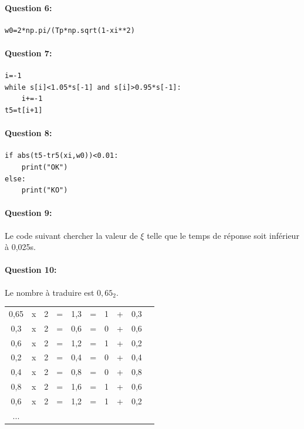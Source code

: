 \paragraph{Question 6:}

\begin{center}
\begin{verbatim}
w0=2*np.pi/(Tp*np.sqrt(1-xi**2)
\end{verbatim}
\end{center}

\paragraph{Question 7:}


\begin{center}
\begin{verbatim}
i=-1
while s[i]<1.05*s[-1] and s[i]>0.95*s[-1]:
    i+=-1
t5=t[i+1]
\end{verbatim}
\end{center}

\paragraph{Question 8:}

\begin{center}
\begin{verbatim}
if abs(t5-tr5(xi,w0))<0.01:
    print("OK")
else:
    print("KO")
\end{verbatim}
\end{center}

\paragraph{Question 9:}

Le code suivant chercher la valeur de $\xi$ telle que le temps de réponse soit inférieur à 0,025s.

\paragraph{Question 10:}

Le nombre à traduire est $0,65_2$.

\begin{tabular}{c c c c c c c c c c}
0,65 & x & 2 & = & 1,3 & = &  1 & + & 0,3 \\
0,3 & x & 2 & = & 0,6 & = &  0 & + & 0,6 \\
0,6 & x & 2 & = & 1,2 & = &  1 & + & 0,2 \\
0,2 & x & 2 & = & 0,4 & = &  0 & + & 0,4 \\
0,4 & x & 2 & = & 0,8 & = &  0 & + & 0,8 \\
0,8 & x & 2 & = & 1,6 & = &  1 & + & 0,6 \\
0,6 & x & 2 & = & 1,2 & = &  1 & + & 0,2 \\
...
\end{tabular}

